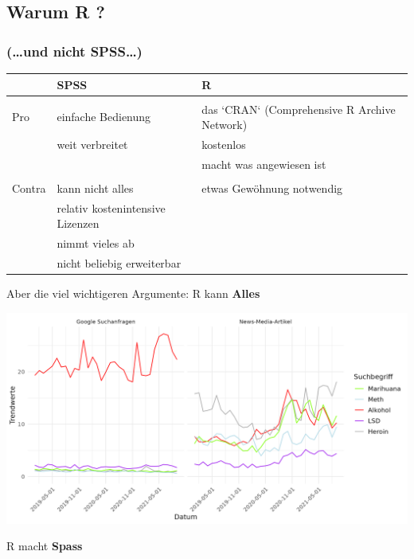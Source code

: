 \documentclass[
]{book}
\begin{document}
\hypertarget{warum-r}{%
\subsection*{Warum R ?}\label{warum-r}}

\hypertarget{und-nicht-spss}{%
\subsubsection*{(\ldots und nicht SPSS\ldots)}\label{und-nicht-spss}}

\begin{table}
\centering
\begin{tabular}[t]{l|l|l}
\hline
  & SPSS & R\\
\hline
 &  & \\
\hline
Pro & einfache Bedienung & das `CRAN` (Comprehensive R Archive Network)\\
\hline
 & weit verbreitet & kostenlos\\
\hline
 &  & macht was angewiesen ist\\
\hline
 &  & \\
\hline
Contra & kann nicht alles & etwas Gewöhnung notwendig\\
\hline
 & relativ kostenintensive Lizenzen & \\
\hline
 & nimmt vieles ab & \\
\hline
 & nicht beliebig erweiterbar & \\
\hline
\end{tabular}
\end{table}

Aber die viel wichtigeren Argumente:
R kann \textbf{Alles}

\begin{center}\includegraphics[width=0.7\linewidth]{imgs/drugs} \end{center}

R macht \textbf{Spass}
\end{document}
